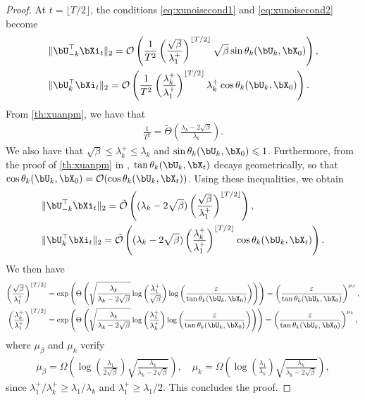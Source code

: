 \documentclass{article}
\theoremstyle{plain}
\theoremstyle{definition}
\theoremstyle{remark}
\begin{document}
\begin{proof}
  At $t = \lfloor T/2 \rfloor$, the conditions \eqref{eq:xunoisecond1} and \eqref{eq:xunoisecond2} become
  \begin{align*}
      & \Vert \bU_{-k}^\top\bXi_t \Vert_2 = \mathcal{O} \left(\frac{1}{T^2} \left(\frac{\sqrt{\beta}}{\lambda_1^+}\right)^{\lfloor T/2 \rfloor} \sqrt{\beta} \sin\theta_k(\bU_k, \bX_0)\right) , \\
      & \Vert \bU_k^\top \bXi_t \Vert_2 = \mathcal{O} \left( \frac{1}{T^2} \left(\frac{\lambda_k^+}{\lambda_1^+}\right)^{\lfloor T/2 \rfloor} \lambda_k^+ \cos\theta_k(\bU_k, \bX_0)\right).
  \end{align*}
  From \cref{th:xuanpm}, we have that 
  \begin{align*}
    \frac{1}{T^2} = \tilde{\Theta}\left(\frac{\lambda_k-2\sqrt{\beta}}{\lambda_k} \right).
  \end{align*}
  We also have that $\sqrt{\beta} \leqslant \lambda_k^+ \leqslant \lambda_k$ and $\sin\theta_k(\bU_k, \bX_0) \leqslant 1$. Furthermore, from the proof of \cref{th:xuanpm} in \cite{xu2023anpm}, $\tan\theta_k(\bU_k, \bX_t)$ decays geometrically, so that $\cos\theta_k(\bU_k, \bX_0) = \mathcal{O}(\cos\theta_k(\bU_k, \bX_t))$. Using these inequalities, we obtain
  \begin{align*}
      & \Vert \bU_{-k}^\top\bXi_t \Vert_2 = \tilde{\mathcal{O}} \left( (\lambda_k - 2\sqrt{\beta}) \left(\frac{\sqrt{\beta}}{\lambda_1^+}\right)^{\lfloor T/2 \rfloor}  \right) , \\
      & \Vert \bU_k^\top \bXi_t \Vert_2 = \tilde{\mathcal{O}} \left( (\lambda_k - 2\sqrt{\beta}) \left(\frac{\lambda_k^+}{\lambda_1^+}\right)^{\lfloor T/2 \rfloor} \cos\theta_k(\bU_k, \bX_t)\right).
  \end{align*}
  We then have
  \begin{align*}
    \left(\frac{\sqrt{\beta}}{\lambda_1^+}\right)^{\lfloor T/2 \rfloor} & = \exp\left(\Theta\left(\sqrt{\frac{\lambda_k}{\lambda_k-2\sqrt{\beta}}}\log\left(\frac{\lambda_1^+}{\sqrt{\beta}}\right) \log\left(\frac{\varepsilon}{\tan\theta_k(\bU_k,\bX_0)}\right) \right) \right) = \left(\frac{\varepsilon}{\tan\theta_k(\bU_k,\bX_0)}\right)^{\mu_\beta}, \\
    \left(\frac{\lambda_k^+}{\lambda_1^+}\right)^{\lfloor T/2 \rfloor} & = \exp\left(\Theta\left(\sqrt{\frac{\lambda_k}{\lambda_k-2\sqrt{\beta}}}\log\left(\frac{\lambda_1^+}{\lambda_k^+}\right) \log\left(\frac{\varepsilon}{\tan\theta_k(\bU_k,\bX_0)}\right) \right) \right) = \left(\frac{\varepsilon}{\tan\theta_k(\bU_k,\bX_0)}\right)^{\mu_k},
  \end{align*}
  where $\mu_\beta$ and $\mu_k$ verify
  \begin{align*}
    \mu_\beta = \Omega\left(\log\left(\frac{\lambda_1}{2\sqrt{\beta}}\right)\sqrt{\frac{\lambda_k}{\lambda_k-2\sqrt{\beta}}}\right), \quad
    \mu_k = \Omega\left(\log\left(\frac{\lambda_1}{\lambda_k}\right)\sqrt{\frac{\lambda_k}{\lambda_k-2\sqrt{\beta}}}\right),
  \end{align*}
  since $\lambda_1^+/\lambda_k^+\geqslant \lambda_1/\lambda_k$ and $\lambda_1^+ \geqslant \lambda_1/2$. This concludes the proof.
\end{proof}
\end{document}
